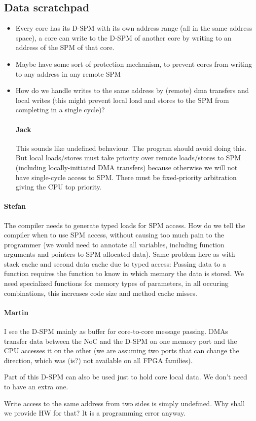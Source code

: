 \documentclass{IEEEtran}
\newcommand{\comment}[3]{\paragraph*{\textbf{#1}}{\color{#3}#2}}
\newcommand{\martin}[1]{\comment{Martin}{#1}{Blue}}
\newcommand{\stefan}[1]{\comment{Stefan}{#1}{RoyalPurple}}
\newcommand{\jack}[1]{\comment{Jack}{#1}{Magenta}}
\begin{document}
\subsection{Data scratchpad}

\begin{itemize}
  \item Every core has its D-SPM with its own address range (all in the same address space), a core can write to the D-SPM of another core
  by writing to an address of the SPM of that core.
  \item Maybe have some sort of protection mechanism, to prevent cores from writing to any address in any remote SPM
  \item How do we handle writes to the same address by (remote) dma transfers and local writes (this might prevent local load and stores to
  the SPM from completing in a single cycle)?  \jack{This sounds
    like undefined behaviour. The program should avoid doing this.
    But local loads/stores must take priority over remote loads/stores
    to SPM (including locally-initiated DMA transfers) because otherwise
    we will not have single-cycle access to SPM. There must be fixed-priority
    arbitration giving the CPU top priority.}
\end{itemize}

\stefan{The compiler needs to generate typed loads for SPM access. How do we tell the compiler when to use SPM access, without causing too
much pain to the programmer (we would need to annotate all variables, including function arguments and pointers to SPM allocated data). 
Same problem here as with stack cache and second data cache due to typed access: Passing data to a function requires the function to know in which memory the
data is stored. We need specialized functions for
memory types of parameters, in all occuring combinations, this increases code size and method cache misses.}

\martin{I see the D-SPM mainly as buffer for core-to-core message passing.
DMAs transfer data between the NoC and the D-SPM on one memory port
and the CPU accesses it on the other (we are assuming two ports that can
change the direction, which was (is?) not available on all FPGA families).

Part of this D-SPM can also be used just to hold core local data. We don't
need to have an extra one.

Write access to the same address from two sides is simply undefined.
Why shall we provide HW for that? It is a programming error anyway.}
\end{document}
